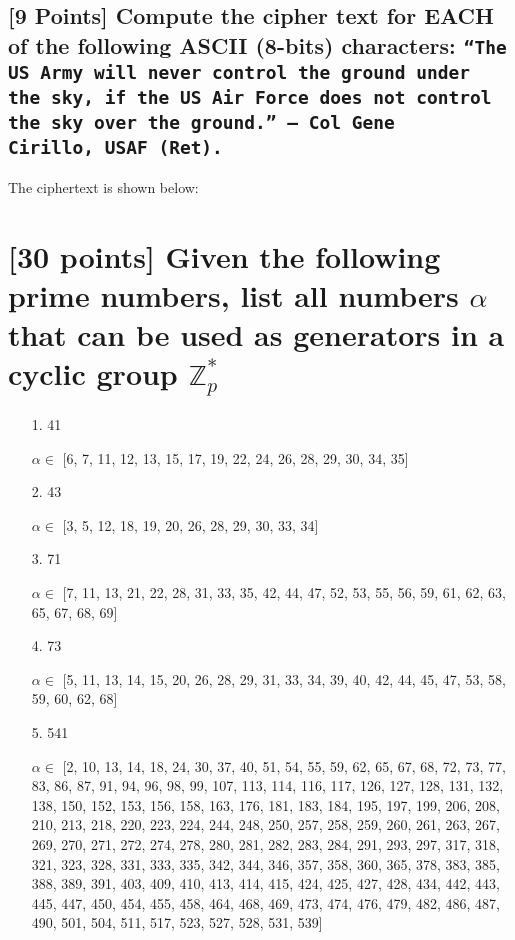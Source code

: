 \documentclass{article}
\begin{document}
\newpage
\subsection{[9 Points] Compute the cipher text for EACH of the following ASCII (8-bits) characters: \texttt{``The US Army will never control the ground under the sky, if the US Air Force does not control the sky over the ground.'' -- Col Gene \\Cirillo, USAF (Ret). }}
The ciphertext is shown below:


\section{[30 points] Given the following prime numbers, list all numbers $\alpha$ that can be used as generators in a cyclic group $\mathbb{Z}_p^{*}$}

\begin{enumerate}
 \item [1. ]41
 
 $\alpha \in$ [6, 7, 11, 12, 13, 15, 17, 19, 22, 24, 26, 28, 29, 30, 34, 35]
 
 \item [2. ]43
 
 $\alpha \in$ [3, 5, 12, 18, 19, 20, 26, 28, 29, 30, 33, 34]
 
 \item [3. ]71
 
 $\alpha \in$  [7, 11, 13, 21, 22, 28, 31, 33, 35, 42, 44, 47, 52, 53, 55, 56, 59, 61, 62, 63, 65, 67, 68, 69]
 
 \item [4. ]73
 
 $\alpha \in$ [5, 11, 13, 14, 15, 20, 26, 28, 29, 31, 33, 34, 39, 40, 42, 44, 45, 47, 53, 58, 59, 60, 62, 68]
 
 \item [5. ]541
 
 $\alpha \in$ [2, 10, 13, 14, 18, 24, 30, 37, 40, 51, 54, 55, 59, 62, 65, 67, 68, 72, 73, 77, 83, 86, 87, 91, 94, 96, 98, 99, 107, 113, 114, 116, 117, 126, 127, 128, 131, 132, 138, 150, 152, 153, 156, 158, 163, 176, 181, 183, 184, 195, 197, 199, 206, 208, 210, 213, 218, 220, 223, 224, 244, 248, 250, 257, 258, 259, 260, 261, 263, 267, 269, 270, 271, 272, 274, 278, 280, 281, 282, 283, 284, 291, 293, 297, 317, 318, 321, 323, 328, 331, 333, 335, 342, 344, 346, 357, 358, 360, 365, 378, 383, 385, 388, 389, 391, 403, 409, 410, 413, 414, 415, 424, 425, 427, 428, 434, 442, 443, 445, 447, 450, 454, 455, 458, 464, 468, 469, 473, 474, 476, 479, 482, 486, 487, 490, 501, 504, 511, 517, 523, 527, 528, 531, 539]
\end{enumerate}
\end{document}

